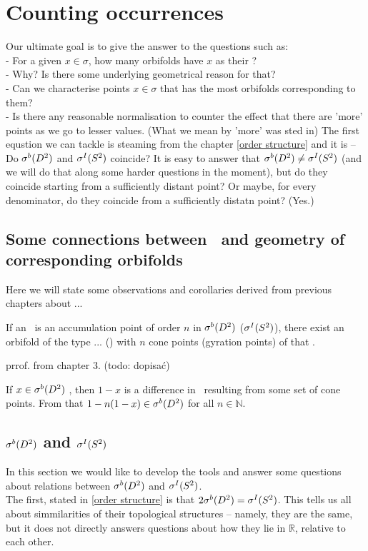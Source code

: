\chapter{Counting occurrences} \label{counting occurrences}
Our ultimate goal is to give the answer to the questions such as: \\
- For a given $x \in \sigma$, how many orbifolds have $x$ as their \Eoc?\\
- Why? Is there some underlying geometrical reason for that?\\
- Can we characterise points $x \in \sigma$ that has the most orbifolds corresponding to them? \\
- Is there any reasonable normalisation to counter the effect that there are 'more' points as we go 
to lesser values. (What we mean by 'more' was sted in)
The first equstion we can tackle is steaming from the chapter \ref{order structure} 
and it is -- Do ${\mathcal{\sigma}^b(D^2)}$ and $\sIS$ coincide? It is easy to answer that ${\mathcal{\sigma}^b(D^2)} \neq {\mathcal{\sigma}^I(S^2)}$ 
(and we will do that along some harder questions in the moment), but do they coincide 
starting from a sufficiently distant point? Or maybe, for every denominator, do they coincide 
from a sufficiently distatn point? (Yes.) \\
\section{Some connections between \Eoc\ and geometry of corresponding orbifolds}
Here we will state some observations and corollaries derived from previous chapters 
about ... \\
\begin{observation}
If an \Eoc\ is an accumulation point of order $n$ in ${\mathcal{\sigma}^b(D^2)}$ ($\sIS$), there exist an 
orbifold of the type ... () with $n$ cone points (gyration points) of that \Eoc. 
\end{observation}
prrof. from chapter 3. (todo: dopisać)
\begin{observation}\label{adding_multiplied_differences}
If $x \in {\mathcal{\sigma}^b(D^2)}$ \dsa{$\sIS$}, then $1-x$  is a difference in \Eoc\ resulting 
from some set of cone  points. From that $1-n(1-x) \in {\mathcal{\sigma}^b(D^2)}$  
for all $n \in \mathbb{N}$. 
\end{observation}

\section{${\mathcal{\sigma}^b(D^2)}$ and $\sIS$}
In this section we would like to develop the tools and answer some questions about 
relations between ${\mathcal{\sigma}^b(D^2)}$ and $\sIS$. \\
The first, stated in \ref{order structure} is that $2{\mathcal{\sigma}^b(D^2)}={\mathcal{\sigma}^I(S^2)}$. 
This tells us all about simmilarities of their topological structures -- namely, they are the same, 
but it does not directly answers questions about how they lie in $\mathbb{R}$, relative 
to each other. \\
